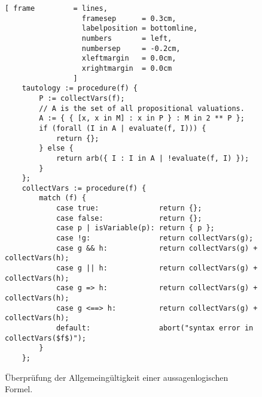\begin{figure}[!ht]
  \centering
\begin{Verbatim}[ frame         = lines, 
                  framesep      = 0.3cm, 
                  labelposition = bottomline,
                  numbers       = left,
                  numbersep     = -0.2cm,
                  xleftmargin   = 0.0cm,
                  xrightmargin  = 0.0cm
                ]
    tautology := procedure(f) {
        P := collectVars(f);
        // A is the set of all propositional valuations.
        A := { { [x, x in M] : x in P } : M in 2 ** P };
        if (forall (I in A | evaluate(f, I))) {
            return {};
        } else {
            return arb({ I : I in A | !evaluate(f, I) });
        }
    };
    collectVars := procedure(f) {
        match (f) {
            case true:              return {};
            case false:             return {};
            case p | isVariable(p): return { p };
            case !g:                return collectVars(g);
            case g && h:            return collectVars(g) + collectVars(h);
            case g || h:            return collectVars(g) + collectVars(h);
            case g => h:            return collectVars(g) + collectVars(h);
            case g <==> h:          return collectVars(g) + collectVars(h);
            default:                abort("syntax error in collectVars($f$)");
        }
    };
\end{Verbatim}
\vspace*{-0.3cm}
  \caption{\"{U}berpr\"{u}fung der Allgemeing\"{u}ltigkeit einer aussagenlogischen Formel.}
  \label{fig:tautology.stlx}
\end{figure} 

